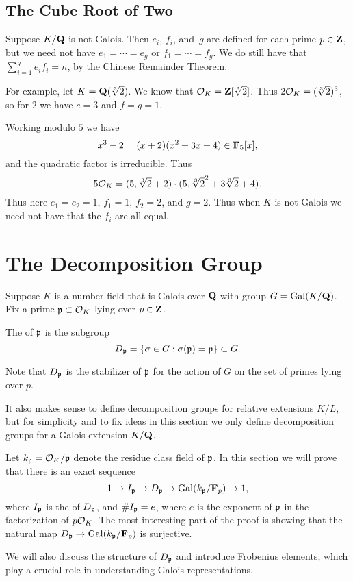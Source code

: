 \subsection{The Cube Root of Two}
Suppose $K/\mathbf{Q}$ is not Galois.  Then $e_i$, $f_i$, and~$g$ are defined for each prime $p\in\mathbf{Z}$,
but we need not have $e_1=\cdots=e_g$ or $f_1=\cdots =f_g$.  We do still have that
$\sum_{i=1}^g e_i f_i = n$, by the Chinese Remainder Theorem.

For example, let $K=\mathbf{Q}(\sqrt[3]{2})$. We know that $\mathcal{O}_K = \mathbf{Z}[\sqrt[3]{2}]$.  Thus
$2\mathcal{O}_K = (\sqrt[3]{2})^3$, so for $2$ we have $e=3$ and $f=g=1$.  

Working modulo $5$ we have
$$
 x^3 - 2 = (x+2)(x^2+3x+4) \in \mathbf{F}_5[x],
$$
and the quadratic factor is irreducible.  Thus
$$
 5\mathcal{O}_K = (5, \sqrt[3]{2}+2)\cdot (5, \sqrt[3]{2}^2 + 3\sqrt[3]{2} + 4).
$$
Thus here $e_1=e_2=1$, $f_1=1$, $f_2=2$, and $g=2$.
Thus when $K$ is not Galois we need not have that the $f_i$
are all equal.


\section{The Decomposition Group}
Suppose $K$ is a number field that is Galois over $\mathbf{Q}$ with
group $G=\operatorname{Gal}(K/\mathbf{Q})$.
Fix a prime $\mathfrak{p}\subset \mathcal{O}_K$ lying over $p\in\mathbf{Z}$.  
\begin{definition}\label{def:decomp}
The  of $\mathfrak{p}$ is the subgroup
$$
  D_{\mathfrak{p}} = \{\sigma \in G : \sigma(\mathfrak{p})=\mathfrak{p}\} \subset G.
$$
\end{definition}
Note that $D_{\mathfrak{p}}$ is the stabilizer of $\mathfrak{p}$ for
the action of $G$ on the set of primes lying over $p$.

It also makes sense to define decomposition groups for relative
extensions $K/L$, but for simplicity and to fix ideas in this section
we only define decomposition groups for a Galois extension $K/\mathbf{Q}$.

Let $k_{\mathfrak{p}} = \mathcal{O}_K/\mathfrak{p}$ denote the residue class field of $\mathfrak{p}$.
In this section we will prove that there is an exact sequence
$$
  1\to I_{\mathfrak{p}} \to D_{\mathfrak{p}} \to \operatorname{Gal}(k_{\mathfrak{p}}/\mathbf{F}_p)\to 1,
$$
where $I_{\mathfrak{p}}$ is the  of $D_{\mathfrak{p}}$, and
$\#I_{\mathfrak{p}}=e$, where $e$ is the exponent of $\mathfrak{p}$ in the factorization of $p\mathcal{O}_K$.  The most interesting part of the proof is
showing that the natural map $D_{\mathfrak{p}}\to  \operatorname{Gal}(k_{\mathfrak{p}}/\mathbf{F}_p)$
is surjective.

We will also discuss the structure of $D_{\mathfrak{p}}$ and introduce
Frobenius elements, which play a crucial role in understanding Galois
representations.


